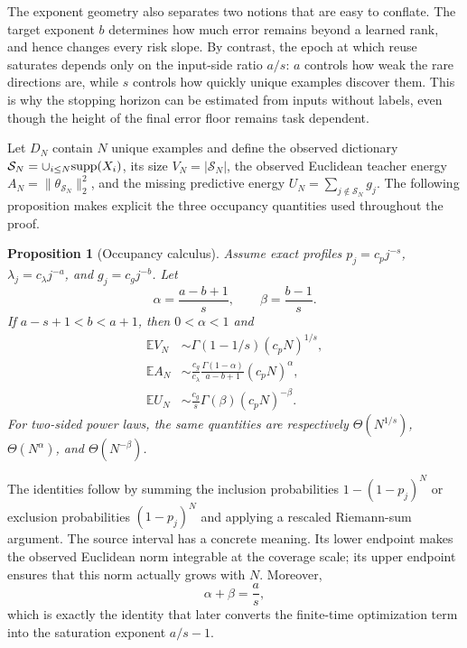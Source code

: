 \documentclass[letterpaper]{article}
\newtheorem{proposition}[theorem]{Proposition}
\newcommand{\E}{\mathbb E}
\newcommand{\cS}{\mathcal S}
\begin{document}
The exponent geometry also separates two notions that are easy to conflate.
The target exponent $b$ determines how much error remains beyond a learned rank,
and hence changes every risk slope. By contrast, the epoch at which reuse
saturates depends only on the input-side ratio $a/s$: $a$ controls how weak the
rare directions are, while $s$ controls how quickly unique examples discover
them. This is why the stopping horizon can be estimated from inputs without
labels, even though the height of the final error floor remains task dependent.

Let $D_N$ contain $N$ unique examples and define the observed dictionary
$\cS_N=\cup_{i\le N}{\rm supp}(X_i)$, its size $V_N=|\cS_N|$, the observed
Euclidean teacher energy $A_N=\|\theta_{\cS_N}\|_2^2$, and the missing
predictive energy $U_N=\sum_{j\notin\cS_N}g_j$. The following proposition makes
explicit the three occupancy quantities used throughout the proof.

\begin{proposition}[Occupancy calculus]
\label{prop:occupancy}
Assume exact profiles $p_j=c_pj^{-s}$, $\lambda_j=c_\lambda j^{-a}$,
and $g_j=c_gj^{-b}$. Let
\[
\alpha=\frac{a-b+1}{s},\qquad
\beta=\frac{b-1}{s}.
\]
If $a-s+1<b<a+1$, then $0<\alpha<1$ and
\begin{align}
\E V_N
&\sim \Gamma(1-1/s)(c_pN)^{1/s},
\label{eq:EV}\\
\E A_N
&\sim \frac{c_g}{c_\lambda}
\frac{\Gamma(1-\alpha)}{a-b+1}(c_pN)^\alpha,
\label{eq:EA}\\
\E U_N
&\sim \frac{c_g}{s}\Gamma(\beta)(c_pN)^{-\beta}.
\label{eq:EU}
\end{align}
For two-sided power laws, the same quantities are respectively
$\Theta(N^{1/s})$, $\Theta(N^\alpha)$, and $\Theta(N^{-\beta})$.
\end{proposition}

The identities follow by summing the inclusion probabilities
$1-(1-p_j)^N$ or exclusion probabilities $(1-p_j)^N$ and applying a rescaled
Riemann-sum argument. The source interval has a concrete meaning. Its lower
endpoint makes the observed Euclidean norm integrable at the coverage scale;
its upper endpoint ensures that this norm actually grows with $N$. Moreover,
\begin{equation}
\alpha+\beta=\frac as,
\label{eq:alpha-beta}
\end{equation}
which is exactly the identity that later converts the finite-time optimization
term into the saturation exponent $a/s-1$.
\end{document}
